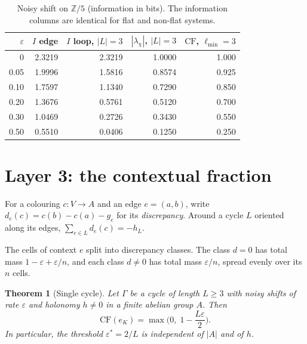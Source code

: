 \documentclass[11pt]{article}
\newtheorem{theorem}{Theorem}
\theoremstyle{definition}
\theoremstyle{remark}
\newcommand{\Z}{\mathbb{Z}}
\newcommand{\CF}{\mathrm{CF}}
\newcommand{\lmin}{\ell_{\min}}
\begin{document}
\begin{table}[h]
\centering
\begin{tabular}{rrrrr}
\toprule
$\varepsilon$ & $I$ edge & $I$ loop, $|L|=3$ & $|\lambda_\chi|$, $|L|=3$ & $\CF$, $\lmin=3$\\
\midrule
0    & 2.3219 & 2.3219 & 1.0000 & 1.000\\
0.05 & 1.9996 & 1.5816 & 0.8574 & 0.925\\
0.10 & 1.7597 & 1.1340 & 0.7290 & 0.850\\
0.20 & 1.3676 & 0.5761 & 0.5120 & 0.700\\
0.30 & 1.0469 & 0.2726 & 0.3430 & 0.550\\
0.50 & 0.5510 & 0.0406 & 0.1250 & 0.250\\
\bottomrule
\end{tabular}
\caption{Noisy shift on $\Z/5$ (information in bits). The information columns are identical for flat and non-flat systems.}
\label{tab:values}
\end{table}

\section{Layer 3: the contextual fraction}

For a colouring $c:V\to A$ and an edge $e=(a,b)$, write $d_e(c)=c(b)-c(a)-g_e$ for its \emph{discrepancy}. Around a cycle $L$ oriented along its edges, $\sum_{e\in L}d_e(c)=-h_L$.

The cells of context $e$ split into discrepancy classes. The class $d=0$ has total mass $1-\varepsilon+\varepsilon/n$, and each class $d\ne0$ has total mass $\varepsilon/n$, spread evenly over its $n$ cells.

\begin{theorem}[Single cycle]\label{thm:cycle}
Let $\Gamma$ be a cycle of length $L\ge3$ with noisy shifts of rate $\varepsilon$ and holonomy $h\neq0$ in a finite abelian group $A$. Then
\[
\CF(e_K)=\max\!\Big(0,\;1-\frac{L\varepsilon}{2}\Big).
\]
In particular, the threshold $\varepsilon^*=2/L$ is independent of $|A|$ and of $h$.
\end{theorem}
\end{document}
